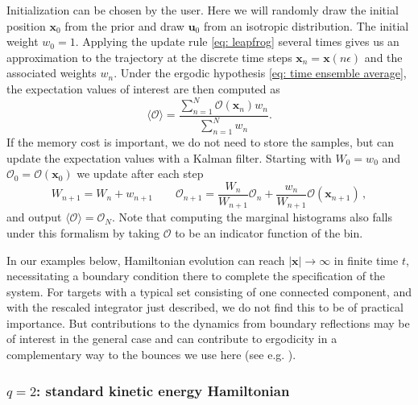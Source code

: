 \documentclass[twoside,11pt]{article}
\newcommand{\x}{\boldsymbol{x}}
\begin{document}

Initialization can be chosen by the user. Here 
we will randomly draw the initial position $\x_0$ from the prior and draw $\boldsymbol{u}_0$ from an isotropic distribution. The initial weight $w_0 = 1$. Applying the update rule \eqref{eq: leapfrog} several times gives us an approximation to the trajectory at the discrete time steps $\x_n = \x(n \epsilon)$ and the associated weights $w_n$. Under the ergodic hypothesis \ref{eq: time ensemble average}, the expectation values of interest are then computed as 
\begin{equation}
    \langle \mathcal{O} \rangle = \frac{\sum_{n = 1}^{N} \mathcal{O}(\x_n) w_n}{\sum_{n = 1}^{N} w_n}.
\end{equation}
If the memory cost is important, we do not need to store the samples, but can update the expectation values with a Kalman filter. Starting with $W_0 = w_0$ and $\mathcal{O}_0 = \mathcal{O}(\x_0)$ we update after each step
\begin{equation}
    W_{n+1} = W_n + w_{n+1} \qquad \mathcal{O}_{n+1} = \frac{W_n}{W_{n+1}}\mathcal{O}_{n} +  \frac{w_n}{W_{n+1}}\mathcal{O}(\x_{n+1})\,,
\end{equation}
and output $\langle \mathcal{O} \rangle = \mathcal{O}_N$. Note that computing the marginal histograms also falls under this formalism by taking $\mathcal{O}$ to be an indicator function of the bin.

In our examples below, Hamiltonian evolution can reach $\vert \x \vert \to \infty$ in finite time $t$, necessitating a boundary condition there to complete the specification of the system.  For targets with a typical set consisting of one connected component, and with the rescaled integrator just described, we do not find this to be of practical importance. But contributions to the dynamics from boundary reflections may be of interest in the general case and can contribute to ergodicity in a complementary way to the bounces we use here (see e.g. \cite{PhysRevLett.77.2941}).




\subsubsection{$q=2$: standard kinetic energy Hamiltonian} \label{sec: TV}
\end{document}
